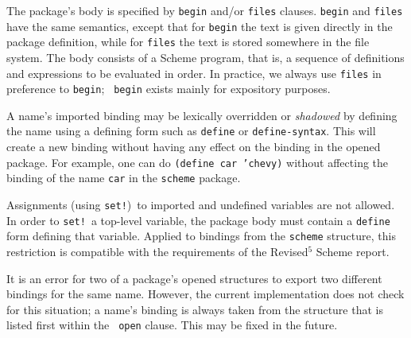 %

The package's body is specified by {\tt begin} and/or {\tt files}
clauses.  {\tt begin} and {\tt files} have the same semantics, except
that for {\tt begin} the text is given directly in the package
definition, while for {\tt files} the text is stored somewhere in the
file system.  The body consists of a Scheme program, that is, a
sequence of definitions and expressions to be evaluated in order.  In
practice, we always use {\tt files} in preference to {\tt begin}; {\tt
begin} exists mainly for expository purposes.

A name's imported binding may be lexically overridden or {\em shadowed}
by defining the name using a defining form such as {\tt define}
or {\tt define-\ok{}syntax}.  This will create a new binding without having
any effect on the binding in the opened package.  For example, one can
do {\tt(define car 'chevy)} without affecting the binding of the name
{\tt car} in the {\tt scheme} package.

Assignments (using {\tt set!})\ to imported and undefined variables
are not allowed.  In order to {\tt set!}\ a top-level variable, the
package body must contain a {\tt define} form defining that variable.
Applied to bindings from the {\tt scheme} structure, this restriction
is compatible with the requirements of the Revised$^5$ Scheme report.

It is an error for two of a package's opened structures to export two
different bindings for the same name.  However, the current
implementation does not check for this situation; a name's binding is
always taken from the structure that is listed first within the {\tt
open} clause.  This may be fixed in the future.

